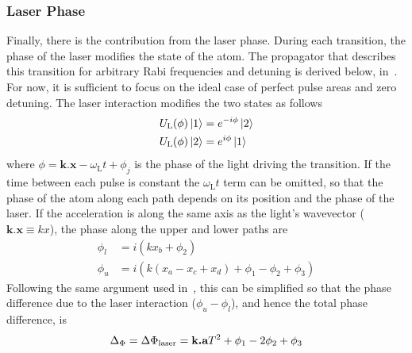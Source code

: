 \subsubsection{Laser Phase}
Finally, there is the contribution from the laser phase. During each
transition, the phase of the laser modifies the state of the atom. The
propagator that describes this transition for arbitrary Rabi
frequencies and detuning is derived below,
in~. For now, it is sufficient to focus
on the ideal case of perfect pulse areas and zero detuning. The laser
interaction modifies the two states as follows
\begin{subequations}
  \begin{align}
    U_\text{L}(\phi) \ket{1} &= e^{-i \phi} \ket{2} \\
    U_\text{L}(\phi) \ket{2} &= e^{i \phi} \ket{1} 
  \end{align}
\end{subequations}
where $\phi = \textbf{k.x} - \omega_\text{L}t + \phi_j$ is the phase
of the light driving the transition. If the time between each pulse is
constant the $\omega_\text{L} t$ term can be omitted, so that the
phase of the atom along each path depends on its position and the
phase of the laser. If the acceleration is along the same axis as the
light's wavevector ($\textbf{k.x} \equiv k x$), the phase along the upper and lower paths are 
\begin{subequations}
  \begin{align}
    \phi_l &= i(k x_b + \phi_2) \\
    \phi_u &= i(k (x_a - x_c + x_d) + \phi_1 - \phi_2 + \phi_3)
  \end{align}
\end{subequations}
Following the same argument used in~, this
can be simplified so that the phase difference due to the laser interaction ($\phi_u -
\phi_l$), and hence the total phase difference, is
\begin{equation}
  \label{eq:phase_interferometer}
  \Delta_\Phi = \Delta \Phi_\textnormal{laser} = \textbf{k.a} T^2 + \phi_1 - 2\phi_2
  + \phi_3
\end{equation}

